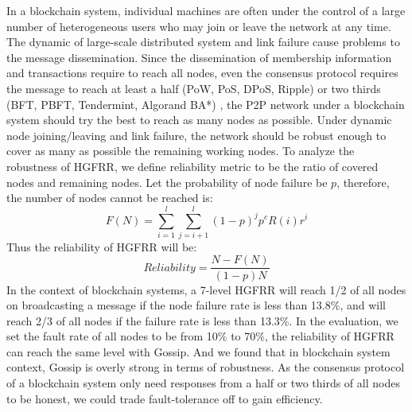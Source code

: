 In a blockchain system, individual machines are often under the control of a large number of heterogeneous users who may join or leave the network at any time. The dynamic of large-scale distributed system and link failure cause problems to the message dissemination. Since the dissemination of membership information and transactions require to reach all nodes, even the consensus protocol requires the message to reach at least a half (PoW, PoS, DPoS, Ripple) or two thirds (BFT, PBFT, Tendermint, Algorand BA*) \cite{zheng2016blockchain}, the P2P network under a blockchain system should try the best to reach as many nodes as possible. Under dynamic node joining/leaving and link failure, the network should be robust enough to cover as many as possible the remaining working nodes.
To analyze the robustness of HGFRR, we define reliability metric to be the ratio of covered nodes and remaining nodes. Let the probability of node failure be $p$, therefore, the number of nodes cannot be reached is: $$F(N)=\sum_{i=1}^{l} \sum_{j=i+1}^{l}(1-p)^jp^cR(i)r^{i}$$
Thus the reliability of HGFRR will be: $$Reliability = \frac{N-F(N)}{(1-p)N}$$
In the context of blockchain systems, a 7-level HGFRR will reach 1/2 of all nodes on broadcasting a message if the node failure rate is less than 13.8\%, and will reach 2/3 of all nodes if the failure rate is less than 13.3\%. In the evaluation, we set the fault rate of all nodes to be from 10\% to 70\%, the reliability of HGFRR can reach the same level with Gossip. And we found that in blockchain system context, Gossip is overly strong in terms of robustness. As the consensus protocol of a blockchain system only need responses from a half or two thirds of all nodes to be honest, we could trade fault-tolerance off to gain efficiency.